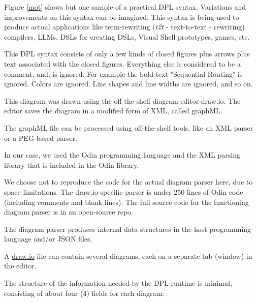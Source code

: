 \documentclass[10pt,anonymous,review]{acmart}
\begin{document}
Figure \ref{mot} shows but one sample of a practical DPL syntax. Variations and
improvements on this syntax can be imagined. This syntax is being used
to produce actual applications like term-rewriting (\emph{t2t} -
text-to-text - rewriting) compilers, LLMs, DSLs for creating DSLs,
Visual Shell prototypes, games, etc.

This DPL syntax consists of only a few kinds of closed figures plus
arrows plus text associated with the closed figures. Everything else is
considered to be a comment, and, is ignored. For example the bold text
"Sequential Routing" is ignored. Colors are ignored. Line shapes and
line widths are ignored, and so on.

This diagram was drawn using the off-the-shelf diagram editor
draw.io\cite{diagrams_net}. The editor saves the diagram in a modified form of XML, called graphML\cite{graphml}.

The graphML file can be processed using off-the-shelf tools, like an XML parser or a PEG\cite{peg}-based parser\cite{ohmjs}.

In our case, we used the Odin programming language\cite{odin} and the XML parsing library that is included in the Odin library.

We choose not to reproduce the code for the actual diagram parser here, due to space limitations. The draw.io-specific parser is under 250 lines of Odin code (including comments and blank lines). The full source code for the functioning diagram parser is in an open-source repo\cite{d2j}.

The diagram parser produces internal data structures in the host programming language and/or JSON\cite{json} files.

A \href{http://draw.io}{draw.io} file can contain several diagrams, each on a separate tab (window) in the editor.

The structure of the information needed by the DPL runtime is minimal, consisting of about four (4) fields for each diagram:
\end{document}
